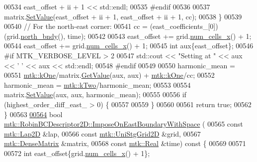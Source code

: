 \begin{DoxyCode}
00534       east\_offset + ii + 1 << std::endl;
00535 \textcolor{preprocessor}{    #endif}
00536 
00537     matrix.\hyperlink{classmtk_1_1DenseMatrix_a784ce5784109ac86bfb9d8562b334b13}{SetValue}(east\_offset + ii + 1, east\_offset + ii + 1, cc);
00538   \}
00539 
00540   \textcolor{comment}{// For the north-east corner:}
00541   cc = (east\_coefficients\_[0])(grid.\hyperlink{classmtk_1_1UniStgGrid2D_afe1ead253cdeb5503e0489eba8fd84e2}{north\_bndy}(), time);
00542 
00543   east\_offset += grid.\hyperlink{classmtk_1_1UniStgGrid2D_a2d182866a398aba8e4829590e85bf939}{num\_cells\_x}() + 1;
00544   east\_offset += grid.\hyperlink{classmtk_1_1UniStgGrid2D_a2d182866a398aba8e4829590e85bf939}{num\_cells\_x}() + 1;
00545   \textcolor{keywordtype}{int} aux\{east\_offset\};
00546 \textcolor{preprocessor}{  #if MTK\_VERBOSE\_LEVEL > 2}
00547   std::cout << \textcolor{stringliteral}{"Setting at "} << aux << \textcolor{charliteral}{' '} << aux << std::endl;
00548 \textcolor{preprocessor}{  #endif}
00549 
00550   harmonic\_mean =
00551     \hyperlink{group__c01-roots_ga26407c24d43b6b95480943340d285c71}{mtk::kOne}/matrix.\hyperlink{classmtk_1_1DenseMatrix_a4b23ecbebd970b5eea915dbb50691024}{GetValue}(aux, aux) + \hyperlink{group__c01-roots_ga26407c24d43b6b95480943340d285c71}{mtk::kOne}/cc;
00552   harmonic\_mean = \hyperlink{group__c01-roots_gaf39c2d851a2db744f4feb1c5ab3ec2cf}{mtk::kTwo}/harmonic\_mean;
00553 
00554   matrix.\hyperlink{classmtk_1_1DenseMatrix_a784ce5784109ac86bfb9d8562b334b13}{SetValue}(aux, aux, harmonic\_mean);
00555 
00556   \textcolor{keywordflow}{if} (highest\_order\_diff\_east\_ > 0) \{
00557 
00559   \}
00560 
00561   \textcolor{keywordflow}{return} \textcolor{keyword}{true};
00562 \}
00563 
\hypertarget{mtk__robin__bc__descriptor__2d_8cc_source_l00564}{}\hyperlink{classmtk_1_1RobinBCDescriptor2D_a37efc8077bf5ea4f28539da248dc2a41}{00564} \textcolor{keywordtype}{bool} \hyperlink{classmtk_1_1RobinBCDescriptor2D_a37efc8077bf5ea4f28539da248dc2a41}{mtk::RobinBCDescriptor2D::ImposeOnEastBoundaryWithSpace}
      (
00565     \textcolor{keyword}{const} \hyperlink{classmtk_1_1Lap2D}{mtk::Lap2D} &lap,
00566     \textcolor{keyword}{const} \hyperlink{classmtk_1_1UniStgGrid2D}{mtk::UniStgGrid2D} &grid,
00567     \hyperlink{classmtk_1_1DenseMatrix}{mtk::DenseMatrix} &matrix,
00568     \textcolor{keyword}{const} \hyperlink{group__c01-roots_gac080bbbf5cbb5502c9f00405f894857d}{mtk::Real} &time)\textcolor{keyword}{ const }\{
00569 
00571 
00572   \textcolor{keywordtype}{int} east\_offset\{grid.\hyperlink{classmtk_1_1UniStgGrid2D_a2d182866a398aba8e4829590e85bf939}{num\_cells\_x}() + 1\};

\end{DoxyCode}
